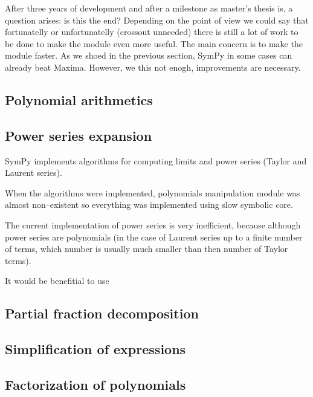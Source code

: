 After three years of development and after a milestone as master's thesis is, a question
arises: is this the end? Depending on the point of view we could say that fortunatelly
or unfortunatelly (crossout unneeded) there is still a lot of work to be done to make
the module even more useful. The main concern is to make the module faster. As we shoed
in the previous section, SymPy in some cases can already beat Maxima. However, we this
not enogh, improvements are necessary.


\subsection{Polynomial arithmetics}

\cite{Monagan2009parallel}
\cite{Monagan2007heaps}
\cite{Bernstein2008fast}


\subsection{Power series expansion}

SymPy implements algorithms for computing limits \cite{Gruntz1996limits} and power series
(Taylor and Laurent series).

When the algorithms were implemented, polynomials manipulation module was almost non--existent
so everything was implemented using slow symbolic core.

The current implementation of power series is very inefficient, because although power
series are polynomials (in the case of Laurent series up to a finite number of terms,
which number is usually much smaller than then number of Taylor terms).

It would be benefitial to use
\cite{Zippel1976expansions}
\cite{Brent1978fps}
\cite{Brent1975series}


\subsection{Partial fraction decomposition}

\cite{Bronstein1993partial}
\cite{Wang1981partial}


\subsection{Simplification of expressions}

\cite{Monagan2006modulo}
\cite{Pearce2001relations}
\cite{Moses1971simplification}


\subsection{Factorization of polynomials}


